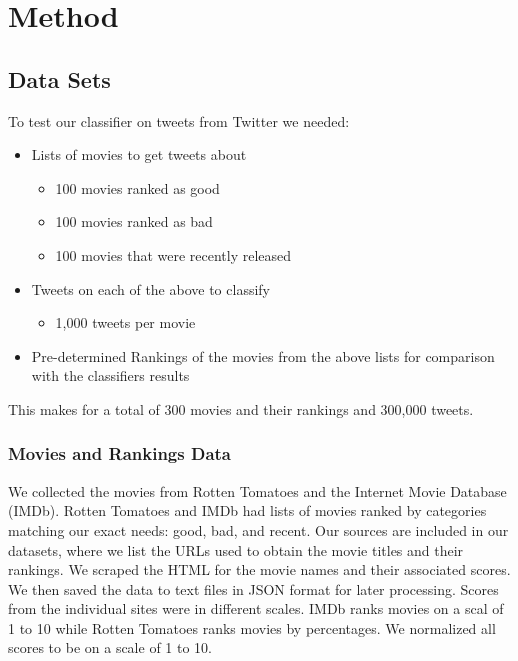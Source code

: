 \documentclass[12pt]{article}
\begin{document}
\section{Method}\label{S:2}
\subsection{Data Sets}\label{S:3}
To test our classifier on tweets from Twitter we needed: 
\begin{itemize}
  \item Lists of movies to get tweets about
  	\begin{itemize}
  		\item 100 movies ranked as good
  		\item 100 movies ranked as bad
  		\item 100 movies that were recently released
  	\end{itemize}
  \item Tweets on each of the above  to classify
  	\begin{itemize}
  		\item 1,000 tweets per movie
  	\end{itemize}
  \item Pre-determined Rankings of the movies from the above lists for comparison with the classifiers results
\end{itemize}
This makes for a total of 300 movies and their rankings and 300,000 tweets.
\subsubsection{Movies and Rankings Data}\label{S:4}
We collected the movies from Rotten Tomatoes and the Internet Movie Database (IMDb). Rotten Tomatoes and IMDb had lists of movies ranked by categories matching our exact needs: good, bad, and recent. Our sources are included in our datasets, where we list the URLs used to obtain the movie titles and their rankings.
We scraped the HTML for the movie names and their associated scores. We then saved the data to text files in JSON format for later processing. Scores from the individual sites were in different scales. IMDb ranks movies on a scal of 1 to 10 while Rotten Tomatoes ranks movies by percentages. We normalized all scores to be on a scale of 1 to 10.
\end{document}
